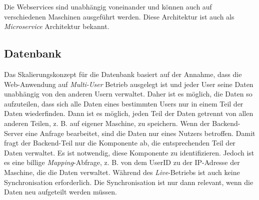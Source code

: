 Die Webservices sind unabhängig voneinander und können auch auf verschiedenen Maschinen ausgeführt werden. Diese Architektur ist auch als \textit{Microservice} Architektur bekannt.

\subsection{Datenbank}

Das Skalierungskonzept für die Datenbank basiert auf der Annahme, dass die Web-Anwendung auf \textit{Multi-User} Betrieb ausgelegt ist und jeder User seine Daten unabhängig von den anderen Usern verwaltet. Daher ist es möglich, die Daten so aufzuteilen, dass sich alle Daten eines bestimmten Users nur in einem Teil der Daten wiederfinden. Dann ist es möglich, jeden Teil der Daten getrennt von allen anderen Teilen, z. B. auf eigener Maschine, zu speichern. Wenn der Backend-Server eine Anfrage bearbeitet, sind die Daten nur eines Nutzers betroffen. Damit fragt der Backend-Teil nur die Komponente ab, die entsprechenden Teil der Daten verwaltet. Es ist notwendig, diese Komponente zu identifizieren. Jedoch ist es eine billige \textit{Mapping}-Abfrage, z. B. von dem UserID zu der IP-Adresse der Maschine, die die Daten verwaltet. Während des \textit{Live}-Betriebs ist auch keine Synchronisation erforderlich. Die Synchronisation ist nur dann relevant, wenn die Daten neu aufgeteilt werden müssen.

